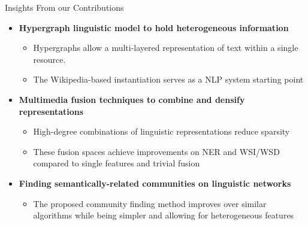\documentclass[10pt,=table]{beamer}
\begin{document}
\begin{frame}{Insights From our Contributions}
\begin{itemize}
\item<1-> \textbf{Hypergraph linguistic model to hold heterogeneous information}
	\begin{itemize}
		\item<1-> Hypergraphs allow a  multi-layered representation of text within a single resource. 
		\item<1-> The Wikipedia-based instantiation serves as a NLP system starting point
		
	\end{itemize}
\item<2-> \textbf{Multimedia fusion techniques to combine and densify representations}
	\begin{itemize}
	\item<2-> High-degree combinations of linguistic representations reduce sparsity 
	\item<2-> These fusion spaces achieve improvements on NER and WSI/WSD compared to single features and trivial fusion

	\end{itemize}
\item<3-> \textbf{Finding semantically-related communities on linguistic networks}
		\begin{itemize}	
		\item<3-> The proposed community finding method improves over similar algorithms while being simpler and allowing for heterogeneous features
		\end{itemize}
\end{itemize}


\end{frame}
\end{document}
